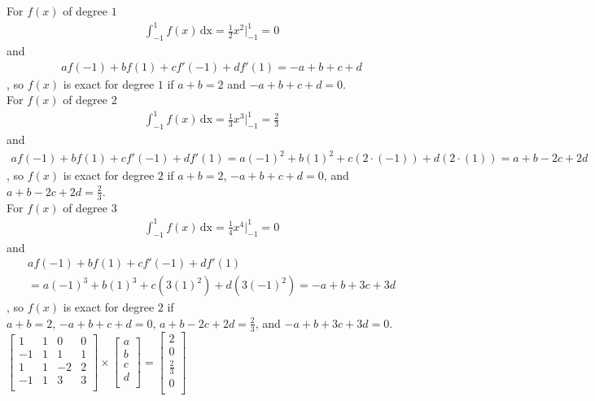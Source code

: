 \documentclass[12pt]{article}
\begin{document}
\begin{enumerate}[label=\bfseries Problem \arabic*:]
For $f(x)$ of degree $1$
\begin{align*}
    \int_{-1}^1 f(x) \, \text{dx}=\frac{1}{2}x^2|_{-1}^{1}=0
\end{align*}
and
\begin{align*}
    a f(-1) + b f(1)+ c f'(-1)+ d f'(1)=-a + b + c + d
\end{align*}
, so $f(x)$ is exact for degree $1$ if $a+b=2$ and $-a+b+c+d=0$.\\

For $f(x)$ of degree $2$
\begin{align*}
    \int_{-1}^1 f(x) \, \text{dx}=\frac{1}{3}x^3|_{-1}^{1}=\frac{2}{3}
\end{align*}
and
\begin{align*}
    a f(-1) + b f(1)+ c f'(-1)+ d f'(1)=a(-1)^2 + b(1)^2 + c(2\cdot(-1)) + d(2\cdot(1)) = a + b - 2c + 2d
\end{align*}
, so $f(x)$ is exact for degree $2$ if $a+b=2$, $-a+b+c+d=0$, and $a+b-2c+2d=\frac{2}{3}$.\\

For $f(x)$ of degree $3$
\begin{align*}
    \int_{-1}^1 f(x) \, \text{dx}=\frac{1}{4}x^4|_{-1}^{1}=0
\end{align*}
and
\begin{multline*}
    a f(-1) + b f(1)+ c f'(-1)+ d f'(1)\\
    =a(-1)^3 + b(1)^3 + c(3(1)^2) + d(3(-1)^2) = -a+b+3c+3d
\end{multline*}
, so $f(x)$ is exact for degree $2$ if\\ $a+b=2$, $-a+b+c+d=0$, $a+b-2c+2d=\frac{2}{3}$, and $-a+b+3c+3d=0$.\\

$\begin{bmatrix}
    1 & 1 & 0 & 0\\
    -1 & 1 & 1 & 1\\
    1 & 1 & -2 & 2\\
    -1 & 1 & 3 & 3\\
\end{bmatrix}
\times
\begin{bmatrix}
    a\\
    b\\
    c\\
    d\\
\end{bmatrix}
=
\begin{bmatrix}
    2\\
    0\\
    \frac{2}{3}\\
    0\\
\end{bmatrix}
$



\end{enumerate}
\end{document}
